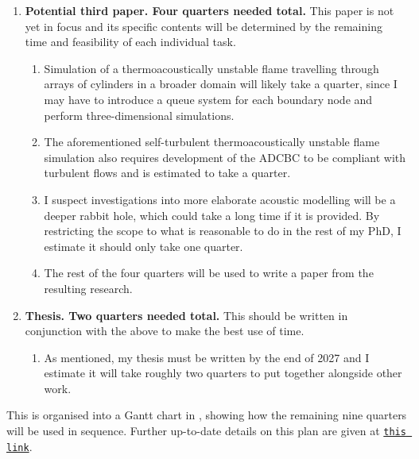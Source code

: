 \begin{enumerate}
\begin{enumerate}
    \end{enumerate}
\item \textbf{Potential third paper. Four quarters needed total.} This paper is not yet in focus and its specific contents will be determined by the remaining time and feasibility of each individual task.
    \begin{enumerate}
    \item Simulation of a thermoacoustically unstable flame travelling through arrays of cylinders in a broader domain will likely take a quarter, since I may have to introduce a queue system for each boundary node and perform three-dimensional simulations.
    \item The aforementioned self-turbulent thermoacoustically unstable flame simulation also requires development of the ADCBC to be compliant with turbulent flows and is estimated to take a quarter.
    \item I suspect investigations into more elaborate acoustic modelling will be a deeper rabbit hole, which could take a long time if it is provided. By restricting the scope to what is reasonable to do in the rest of my PhD, I estimate it should only take one quarter.
    \item The rest of the four quarters will be used to write a paper from the resulting research.
    \end{enumerate}
\item \textbf{Thesis. Two quarters needed total.} This should be written in conjunction with the above to make the best use of time.
    \begin{enumerate}
    \item As mentioned, my thesis must be written by the end of 2027 and I estimate it will take roughly two quarters to put together alongside other work.
    \end{enumerate}
\end{enumerate}
This is organised into a Gantt chart in , showing how the remaining nine quarters will be used in sequence. Further up-to-date details on this plan are given at \href{https://www.dropbox.com/scl/fi/n05qje5z9c43cdeg95ki2/plan-Y3.md?rlkey=8i4jt7dpct4njoq61u0gbnas4&st=0746ct71&dl=0}{\texttt{this link}}.


